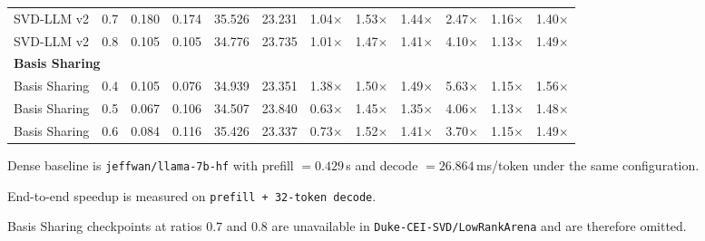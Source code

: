 \begin{table}[t]
\begin{threeparttable}
{\begin{tabular}{llrrrrrrrrrr}
SVD-LLM v2 & 0.7 & 0.180 & 0.174 & 35.526 & 23.231 & 1.04$\times$ & 1.53$\times$ & 1.44$\times$ & 2.47$\times$ & 1.16$\times$ & 1.40$\times$ \\
SVD-LLM v2 & 0.8 & 0.105 & 0.105 & 34.776 & 23.735 & 1.01$\times$ & 1.47$\times$ & 1.41$\times$ & 4.10$\times$ & 1.13$\times$ & 1.49$\times$ \\
\midrule
\multicolumn{12}{l}{\textbf{Basis Sharing}} \\
Basis Sharing & 0.4 & 0.105 & 0.076 & 34.939 & 23.351 & 1.38$\times$ & 1.50$\times$ & 1.49$\times$ & 5.63$\times$ & 1.15$\times$ & 1.56$\times$ \\
Basis Sharing & 0.5 & 0.067 & 0.106 & 34.507 & 23.840 & 0.63$\times$ & 1.45$\times$ & 1.35$\times$ & 4.06$\times$ & 1.13$\times$ & 1.48$\times$ \\
Basis Sharing & 0.6 & 0.084 & 0.116 & 35.426 & 23.337 & 0.73$\times$ & 1.52$\times$ & 1.41$\times$ & 3.70$\times$ & 1.15$\times$ & 1.49$\times$ \\
\bottomrule
\end{tabular}
}
\begin{tablenotes}[flushleft]\footnotesize
\item Dense baseline is \texttt{jeffwan/llama-7b-hf} with prefill $=0.429$\,s and decode $=26.864$\,ms/token under the same configuration.
\item End-to-end speedup is measured on \texttt{prefill + 32-token decode}.
\item Basis Sharing checkpoints at ratios $0.7$ and $0.8$ are unavailable in \texttt{Duke-CEI-SVD/LowRankArena} and are therefore omitted.
\end{tablenotes}
\end{threeparttable}
\end{table}
